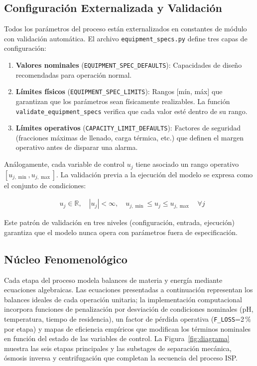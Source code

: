 \documentclass[10pt,letterpaper,twocolumn]{article}
\begin{document}
\subsection{Configuración Externalizada y Validación}

Todos los parámetros del proceso están externalizados en constantes de módulo con validación automática. El archivo \texttt{equipment\_specs.py} define tres capas de configuración:

\begin{enumerate}
    \item \textbf{Valores nominales} (\texttt{EQUIPMENT\_SPEC\_DEFAULTS}): Capacidades de diseño recomendadas para operación normal.
    \item \textbf{Límites físicos} (\texttt{EQUIPMENT\_SPEC\_LIMITS}): Rangos [mín, máx] que garantizan que los parámetros sean físicamente realizables. La función \texttt{validate\_equipment\_specs} verifica que cada valor esté dentro de su rango.
    \item \textbf{Límites operativos} (\texttt{CAPACITY\_LIMIT\_DEFAULTS}): Factores de seguridad (fracciones máximas de llenado, carga térmica, etc.) que definen el margen operativo antes de disparar una alarma.
\end{enumerate}

Análogamente, cada variable de control $u_j$ tiene asociado un rango operativo $[u_{j,\min}, u_{j,\max}]$. La validación previa a la ejecución del modelo se expresa como el conjunto de condiciones:

\begin{align}
& u_j \in \mathbb{R}, \quad |u_j| < \infty, \quad u_{j,\min} \leq u_j \leq u_{j,\max} \quad \forall j
\end{align}

Este patrón de validación en tres niveles (configuración, entrada, ejecución) garantiza que el modelo nunca opera con parámetros fuera de especificación.

\subsection{Núcleo Fenomenológico}

Cada etapa del proceso modela balances de materia y energía mediante ecuaciones algebraicas. Las ecuaciones presentadas a continuación representan los balances ideales de cada operación unitaria; la implementación computacional incorpora funciones de penalización por desviación de condiciones nominales (pH, temperatura, tiempo de residencia), un factor de pérdida operativa (\texttt{F\_LOSS}=2\,\% por etapa) y mapas de eficiencia empíricos que modifican los términos nominales en función del estado de las variables de control. La Figura~\ref{fig:diagrama} muestra las seis etapas principales y las substages de separación mecánica, ósmosis inversa y centrifugación que completan la secuencia del proceso ISP.
\end{document}
